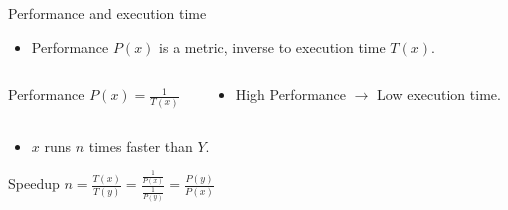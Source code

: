 \begin{frame}[t]{Performance and execution time}
\begin{itemize}
  \item Performance $P(x)$ is a metric, inverse to
        execution time $T(x)$.
\end{itemize}

\begin{columns}
\begin{column}{.4\textwidth}
\begin{block}{Performance}
\begin{math}
P(x) = \frac{1}{T(x)}
\end{math}
\end{block}
\end{column}
\begin{column}{.6\textwidth}
\begin{itemize}
  \item High Performance $\rightarrow$ Low execution time.
\end{itemize}
\end{column}
\end{columns}

\begin{itemize}
  \item $x$ runs $n$ times faster than $Y$.
\end{itemize}
\begin{block}{Speedup}
\begin{math}
n=\frac{T(x)}{T(y)}=
\frac{
\frac{1}{P(x)}
}{
\frac{1}{P(y)}
}
=
\frac{P(y)}{P(x)}
\end{math}
\end{block}
\end{frame}

